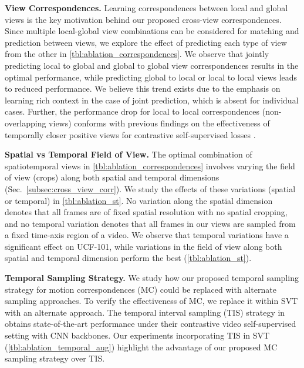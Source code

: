\documentclass[10pt,twocolumn,letterpaper]{article}
\begin{document}
\vspace{0.1em}
\noindent\textbf{View Correspondences.}
Learning correspondences between local and global views is the key motivation behind our proposed cross-view correspondences. Since multiple local-global view combinations can be considered for matching and prediction between views, we explore the effect of predicting each type of view from the other in \cref{tbl:ablation_correspondences}. We observe that jointly predicting local to global and global to global view correspondences results in the optimal performance, while predicting global to local or local to local views leads to reduced performance. We believe this trend exists due to the emphasis on learning rich context in the case of joint prediction, which is absent for individual cases. 
{Further, the performance drop for local to local correspondences (non-overlapping views) conforms with previous findings on the effectiveness of temporally closer positive views for contrastive self-supervised losses \cite{qian2020spatiotemporal, Feichtenhofer_large}.}

\vspace{0.1em}
\noindent\textbf{Spatial vs Temporal Field of View.} The optimal combination of spatiotemporal views in \cref{tbl:ablation_correspondences} involves varying the field of view (crops) along both spatial and temporal dimensions (Sec.~\ref{subsec:cross_view_corr}). We study the effects of these variations (spatial or temporal) in  \cref{tbl:ablation_st}. No variation along the spatial dimension denotes that all frames 
are of fixed spatial resolution  
with no spatial cropping, 
and no temporal variation denotes that all frames in our views are sampled from a fixed time-axis region of a video. We observe that temporal variations have a significant effect on UCF-101, while variations in the field of view along both spatial and temporal dimension perform the best (\cref{tbl:ablation_st}).

\vspace{0.1em}
\noindent\textbf{Temporal Sampling Strategy.} 
We study how our proposed temporal sampling strategy for motion correspondences (MC) could be replaced with alternate sampling approaches. To verify the effectiveness of MC, we replace it within SVT with an alternate approach. The temporal interval sampling (TIS) strategy in \cite{qian2020spatiotemporal} obtains state-of-the-art performance under their contrastive video self-supervised setting with CNN backbones. Our experiments incorporating TIS in SVT (\cref{tbl:ablation_temporal_aug}) highlight the advantage of our proposed MC sampling strategy over TIS.  
\end{document}
